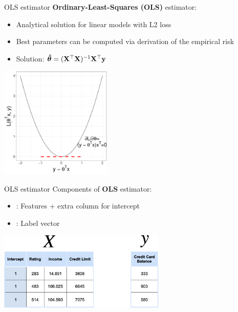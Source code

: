 \documentclass[11pt,compress,t,notes=noshow, xcolor=table]{beamer}
\begin{document}
\begin{vbframe}{OLS estimator}
\small \textbf{Ordinary-Least-Squares (OLS)} estimator: 
\begin{itemize}
    \item \small Analytical solution for linear models with L2 loss
    \item \small Best parameters can be computed via derivation of the empirical risk
    \item \small Solution:  $\bm{\hat\theta} = (\mathbf{X}^\top \mathbf{X})^{-1} \mathbf{X}^\top \mathbf{y}$
\end{itemize}

\begin{center}
 \includegraphics[width =0.4\textwidth]{slides/supervised-regression/figure/nutshell-regression-derivative-L2.pdf}
\end{center}
\end{vbframe}
   




\begin{vbframe}{OLS estimator}
Components of \textbf{OLS} estimator:
\begin{itemize}
    \item \Xmat: Features + extra column for intercept
    \item \yv: Label vector
\end{itemize}
\vspace{0.7 cm}
  \includegraphics[width = 0.6\textwidth]{slides/supervised-regression/figure_man/nutshell-regression-design-matrix.png}


\end{vbframe}
\end{document}
